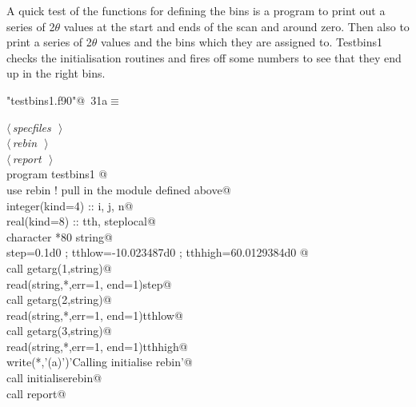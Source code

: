 \documentclass[10pt,a4paper,notitlepage]{article}
\begin{document}
A quick test of the functions for defining the bins is a program to print out 
a series of 2$\theta$ values at the start and ends of the scan and around zero.
Then also to print a series of 2$\theta$ values and the bins which they
are assigned to. Testbins1 checks the initialisation routines and fires off 
some numbers to see that they end up in the right bins.

\begin{flushleft} \small
\begin{minipage}{\linewidth}\label{scrap35}\raggedright\small
{} \verb@"testbins1.f90"@\nobreak\ {\footnotesize {31a}}$\equiv$
\vspace{-1ex}
\begin{list}{}{} \item
\mbox{}\verb@@\hbox{$\langle\,${\it specfiles}\nobreak\ {\footnotesize {}}$\,\rangle$}\verb@@\\
\mbox{}\verb@@\hbox{$\langle\,${\it rebin}\nobreak\ {\footnotesize {}}$\,\rangle$}\verb@@\\
\mbox{}\verb@@\hbox{$\langle\,${\it report}\nobreak\ {\footnotesize {}}$\,\rangle$}\verb@@\\
\mbox{}\verb@      program testbins1 @\\
\mbox{}\verb@      use rebin ! pull in the module defined above@\\
\mbox{}\verb@      integer(kind=4) :: i, j, n@\\
\mbox{}\verb@      real(kind=8) :: tth, steplocal@\\
\mbox{}\verb@      character *80 string@\\
\mbox{}\verb@      step=0.1d0 ; tthlow=-10.023487d0 ; tthhigh=60.0129384d0 @\\
\mbox{}\verb@      call getarg(1,string)@\\
\mbox{}\verb@      read(string,*,err=1, end=1)step@\\
\mbox{}\verb@      call getarg(2,string)@\\
\mbox{}\verb@      read(string,*,err=1, end=1)tthlow@\\
\mbox{}\verb@      call getarg(3,string)@\\
\mbox{}\verb@      read(string,*,err=1, end=1)tthhigh@\\
\mbox{}     write(*,'(a)')'Calling initialise rebin'@\\
\mbox{}\verb@      call initialiserebin@\\
\mbox{}\verb@      call report@\\

\end{list}
\end{minipage}
\end{flushleft}
\end{document}

